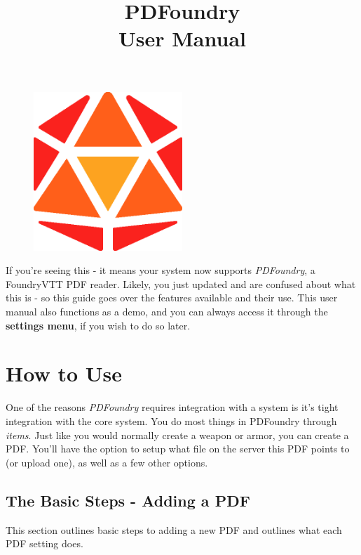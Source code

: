 \documentclass{article}
\title{%
    PDFoundry \\
    \large User Manual}
\date{}
\author{}
\begin{document}
    \begin{figure}[t]
        \centering
        \includegraphics[width=0.5\textwidth]{images/logo.png}
    \end{figure}
    \maketitle

    If you're seeing this - it means your system now supports \textit{PDFoundry}, a FoundryVTT PDF reader. Likely, you just updated and are confused about what this is - so this guide goes over the features available and their use. This user manual also functions as a demo, and you can always access it through the \textbf{settings menu}, if you wish to do so later.

    \tableofcontents

    \section{How to Use}
    One of the reasons \textit{PDFoundry} requires integration with a system is it's tight integration with the core system. You do most things in PDFoundry through \textit{items}. Just like you would normally create a weapon or armor, you can create a PDF. You'll have the option to setup what file on the server this PDF points to (or upload one), as well as a few other options.

    \subsection{The Basic Steps - Adding a PDF}
    This section outlines basic steps to adding a new PDF and outlines what each PDF setting does.
\end{document}
